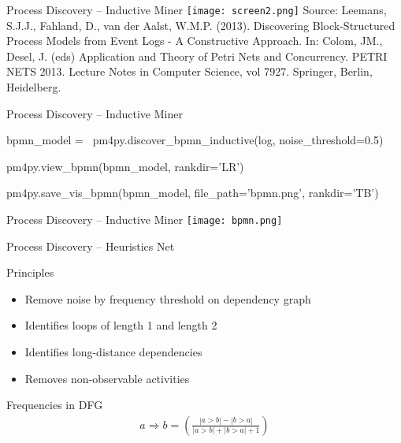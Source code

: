 \documentclass[ignorenonframetext,xcolor=x11names]{beamer}
\begin{document}
\begin{frame}{Process Discovery -- Inductive Miner}
\texttt{[image: screen2.png]}
\tiny 
Source: Leemans, S.J.J., Fahland, D., van der Aalst, W.M.P. (2013). Discovering Block-Structured Process Models from Event Logs - A Constructive Approach. In: Colom, JM., Desel, J. (eds) Application and Theory of Petri Nets and Concurrency. PETRI NETS 2013. Lecture Notes in Computer Science, vol 7927. Springer, Berlin, Heidelberg.
\end{frame}

\begin{frame}[fragile]{Process Discovery -- Inductive Miner}
\footnotesize
\begin{pythoncode}
bpmn_model = \
    pm4py.discover_bpmn_inductive(log, noise_threshold=0.5)

pm4py.view_bpmn(bpmn_model, rankdir='LR')

pm4py.save_vis_bpmn(bpmn_model, 
   file_path='bpmn.png', rankdir='TB')
\end{pythoncode}
\end{frame}

\begin{frame}{Process Discovery -- Inductive Miner}
\centering
\texttt{[image: bpmn.png]}
\end{frame}

\begin{frame}{Process Discovery -- Heuristics Net}
\begin{block}{Principles}
\begin{itemize}
   \item Remove noise by frequency threshold on dependency graph
   \item Identifies loops of length 1 and length 2
   \item Identifies long-distance dependencies
   \item Removes non-observable activities
\end{itemize}
\end{block}

\begin{block}{Frequencies in DFG}
\begin{align*}
a \Rightarrow b = \left( \frac{
| a > b| - |b > a|}{
| a > b| + |b > a| + 1}\right)
\end{align*}
\end{block}
\end{frame}
\end{document}
